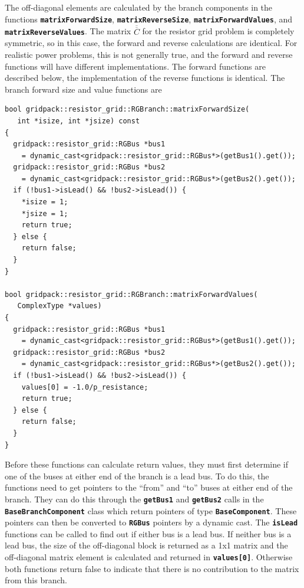 The off-diagonal elements are calculated by the branch components in the functions \texttt{\textbf{matrixForwardSize}}, \texttt{\textbf{matrixReverseSize}}, \texttt{\textbf{matrixForwardValues}}, and \texttt{\textbf{matrixReverseValues}}. The matrix $\overline{\overline{C}}$ for the resistor grid problem is completely symmetric, so in this case, the forward and reverse calculations are identical. For realistic power problems, this is not generally true, and the forward and reverse functions will have different implementations. The forward functions are described below, the implementation of the reverse functions is identical. The branch forward size and value functions are

{
\color{red}
\begin{Verbatim}[fontseries=b]
bool gridpack::resistor_grid::RGBranch::matrixForwardSize(
   int *isize, int *jsize) const
{
  gridpack::resistor_grid::RGBus *bus1
    = dynamic_cast<gridpack::resistor_grid::RGBus*>(getBus1().get());
  gridpack::resistor_grid::RGBus *bus2
    = dynamic_cast<gridpack::resistor_grid::RGBus*>(getBus2().get());
  if (!bus1->isLead() && !bus2->isLead()) {
    *isize = 1;
    *jsize = 1;
    return true;
  } else { 
    return false;
  }
}

bool gridpack::resistor_grid::RGBranch::matrixForwardValues(
   ComplexType *values)
{
  gridpack::resistor_grid::RGBus *bus1
    = dynamic_cast<gridpack::resistor_grid::RGBus*>(getBus1().get());
  gridpack::resistor_grid::RGBus *bus2
    = dynamic_cast<gridpack::resistor_grid::RGBus*>(getBus2().get());
  if (!bus1->isLead() && !bus2->isLead()) {
    values[0] = -1.0/p_resistance;
    return true;
  } else {
    return false;
  }
}
\end{Verbatim}
}

Before these functions can calculate return values, they must first determine if one of the buses at either end of the branch is a lead bus. To do this, the functions need to get pointers to the ``from'' and ``to'' buses at either end of the branch. They can do this through the \texttt{\textbf{getBus1}} and \texttt{\textbf{getBus2}} calls in the \texttt{\textbf{BaseBranchComponent}} class which return pointers of type \texttt{\textbf{BaseComponent}}. These pointers can then be converted to \texttt{\textbf{RGBus}} pointers by a dynamic cast. The \texttt{\textbf{isLead}} functions can be called to find out if either bus is a lead bus. If neither bus is a lead bus, the size of the off-diagonal block is returned as a 1x1 matrix and the off-diagonal matrix element is calculated and returned in \texttt{\textbf{values[0]}}. Otherwise both functions return false to indicate that there is no contribution to the matrix from this branch.

